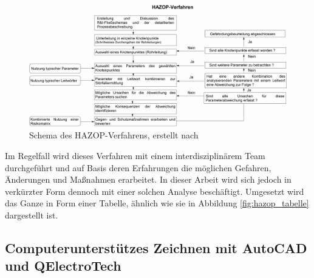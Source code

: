 \begin{figure}[h!]
	\centering
	\includegraphics[width=\textwidth]{img/hazop}
	\caption{Schema des HAZOP-Verfahrens, erstellt nach \cite{KenPatterson.2017, UlfSchubert.2020}}
	\label{fig:hazop}
\end{figure}
\FloatBarrier

Im Regelfall wird dieses Verfahren mit einem interdisziplinärem Team durchgeführt und auf Basis deren Erfahrungen die möglichen Gefahren, Änderungen und Maßnahmen erarbeitet. In dieser Arbeit wird sich jedoch in verkürzter Form dennoch mit einer solchen Analyse beschäftigt. Umgesetzt wird das Ganze in Form einer Tabelle, ähnlich wie sie in Abbildung \ref{fig:hazop_tabelle} dargestellt ist.







\subsection{Computerunterstützes Zeichnen mit AutoCAD und QElectroTech}




